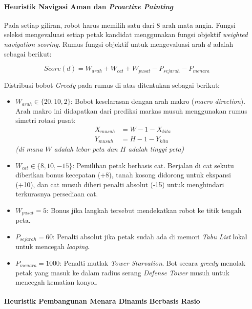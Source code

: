 \paragraph{Heuristik Navigasi Aman dan \textit{Proactive Painting}}

Pada setiap giliran, robot harus memilih satu dari 8 arah mata angin. Fungsi seleksi mengevaluasi setiap petak kandidat menggunakan fungsi objektif \textit{weighted navigation scoring}. Rumus fungsi objektif untuk mengevaluasi arah $d$ adalah sebagai berikut:

\begin{equation}
    Score(d) = W_{arah} + W_{cat} + W_{pusat} - P_{sejarah} - P_{menara}
\end{equation}

Distribusi bobot \textit{Greedy} pada rumus di atas ditentukan sebagai berikut:
\begin{itemize}
    \item $W_{arah} \in \{20, 10, 2\}$: Bobot keselarasan dengan arah makro (\textit{macro direction}). Arah makro ini didapatkan dari prediksi markas musuh menggunakan rumus simetri rotasi pusat:
    \begin{align}
        X_{musuh} &= W - 1 - X_{kita} \\
        Y_{musuh} &= H - 1 - Y_{kita}
    \end{align}
    \textit{(di mana $W$ adalah lebar peta dan $H$ adalah tinggi peta)}
    \item $W_{cat} \in \{8, 10, -15\}$: Pemilihan petak berbasis cat. Berjalan di cat sekutu diberikan bonus kecepatan (+8), tanah kosong didorong untuk ekspansi (+10), dan cat musuh diberi penalti absolut (-15) untuk menghindari terkurasnya persediaan cat.
    \item $W_{pusat} = 5$: Bonus jika langkah tersebut mendekatkan robot ke titik tengah peta.
    \item $P_{sejarah} = 60$: Penalti absolut jika petak sudah ada di memori \textit{Tabu List} lokal untuk mencegah \textit{looping}.
    \item $P_{menara} = 1000$: Penalti mutlak \textit{Tower Starvation}. Bot secara \textit{greedy} menolak petak yang masuk ke dalam radius serang \textit{Defense Tower} musuh untuk mencegah kematian konyol.
\end{itemize}

\paragraph{Heuristik Pembangunan Menara Dinamis Berbasis Rasio}

